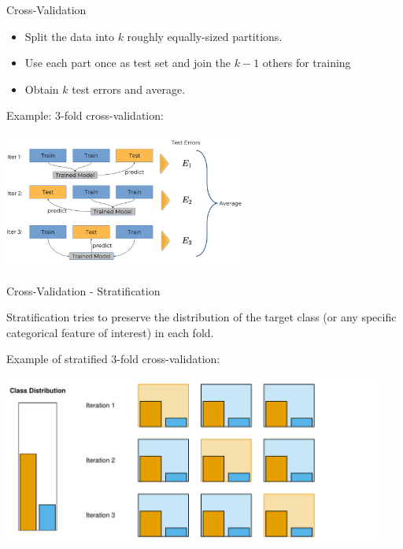 \documentclass[11pt,compress,t,notes=noshow, xcolor=table]{beamer}
\newenvironment{knitrout}{}{} %
\begin{document}
\begin{vbframe}{Cross-Validation}

\begin{itemize}
  \item Split the data into $k$ roughly equally-sized partitions.
  \item Use each part once as test set and join the $k-1$ others for training
  \item Obtain $k$ test errors and average.
\end{itemize}

\lz

Example: 3-fold cross-validation:

\begin{center}
\includegraphics[width=8cm]{figure_man/crossvalidation.png}
\end{center}
\end{vbframe}

\begin{vbframe}{Cross-Validation - Stratification}

Stratification tries to preserve the distribution of the target class (or any specific categorical feature of interest) in each fold.

\lz

Example of stratified 3-fold cross-validation:

\lz

\begin{knitrout}\scriptsize
{}\color{fgcolor}

{\centering \includegraphics[width=0.95\textwidth]{figure/eval_resample_1}

}



\end{knitrout}
\end{vbframe}
\end{document}
